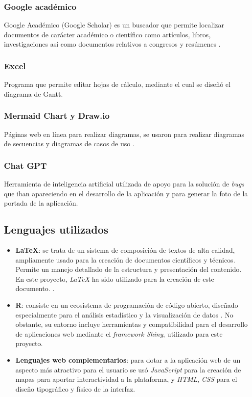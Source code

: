 \subsubsection{Google académico}
Google Académico (Google Scholar) es un buscador que permite localizar documentos de carácter académico o científico como artículos, libros, investigaciones así como documentos relativos a congresos y resúmenes \cite{bibliotecaBiblioguiasGoogleAcademico}.

\subsubsection{Excel}
Programa que permite editar hojas de cálculo, mediante el cual se diseñó el diagrama de Gantt.

\subsubsection{Mermaid Chart y Draw.io} 
Páginas web en línea para realizar diagramas, se usaron para realizar diagramas de secuencias \cite{MermaidChart} y diagramas de casos de uso \cite{Drawio}. 


\subsubsection{Chat GPT}
Herramienta de inteligencia artificial utilizada de apoyo para la solución de \textit{bugs} que iban apareciendo en el desarrollo de la aplicación y para generar la foto de la portada de la aplicación.

\subsection{Lenguajes utilizados }
\begin{itemize}
    \item \textbf{LaTeX}: se trata de un sistema de composición de textos de alta calidad, ampliamente usado para la creación de documentos científicos y técnicos. Permite un manejo detallado de la estructura y presentación del contenido. En este proyecto, \textit{LaTeX} ha sido utilizado para la creación de este documento. \cite{LaTeXDocumentPreparation}.
    
    \item \textbf{R}: consiste en un ecosistema de programación de código abierto, diseñado especialmente para el análisis estadístico y la visualización de datos \cite{PLAKIDAS_2017119}. No obstante, su entorno incluye herramientas y compatibilidad para el desarrollo de aplicaciones web mediante el\textit{ framework Shiny}, utilizado para este proyecto.
    
    \item \textbf{Lenguajes web complementarios}: para dotar a la aplicación web de un aspecto más atractivo para el usuario se usó \textit{JavaScript} para la creación de mapas para aportar interactividad a la plataforma, y \textit{HTML}, \textit{CSS} para el diseño tipográfico y físico de la interfaz. 
\end{itemize}
